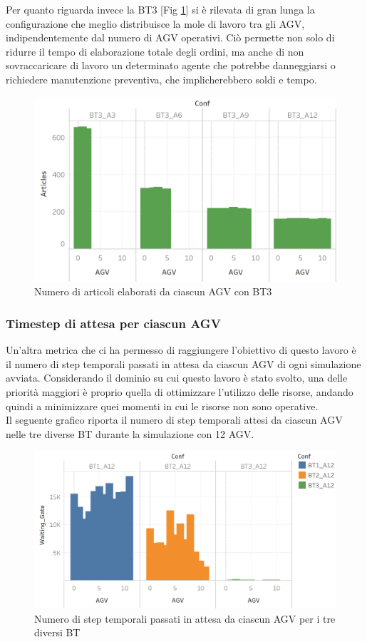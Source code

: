 \documentclass[12pt]{article}
\begin{document}
\noindent Per quanto riguarda invece la BT3 [Fig \ref{fig:articles_agv_bt3}] si è rilevata di gran lunga la configurazione che meglio distribuisce la mole di lavoro tra gli AGV, indipendentemente dal numero di AGV operativi. Ciò permette non solo di ridurre il tempo di elaborazione totale degli ordini, ma anche di non sovraccaricare di lavoro un determinato agente che potrebbe danneggiarsi o richiedere manutenzione preventiva, che implicherebbero soldi e tempo.
 
\begin{figure}[H]
\centering
  \includegraphics[width=0.8\linewidth]{Figures/Results_Graphics/Articles_BT3.png}
  \caption{Numero di articoli elaborati da ciascun AGV con BT3}\label{fig:articles_agv_bt3}
\end{figure}

\newpage

\subsubsection{Timestep di attesa per ciascun AGV}
Un'altra metrica che ci ha permesso di raggiungere l'obiettivo di questo lavoro è il numero di step temporali passati in attesa da ciascun AGV di ogni simulazione avviata. Considerando il dominio su cui questo lavoro è stato svolto, una delle priorità maggiori è proprio quella di ottimizzare l'utilizzo delle risorse, andando quindi a minimizzare quei momenti in cui le risorse non sono operative. \\

Il seguente grafico riporta il numero di step temporali attesi da ciascun AGV nelle tre diverse BT durante la simulazione con 12 AGV.
\begin{figure}[H]
\centering
  \includegraphics[width=1\linewidth]{Figures/Results_Graphics/Waiting.png}
  \caption{Numero di step temporali passati in attesa da ciascun AGV per i tre diversi BT}\label{fig:waiting_bt_a12}
\end{figure}
\end{document}
